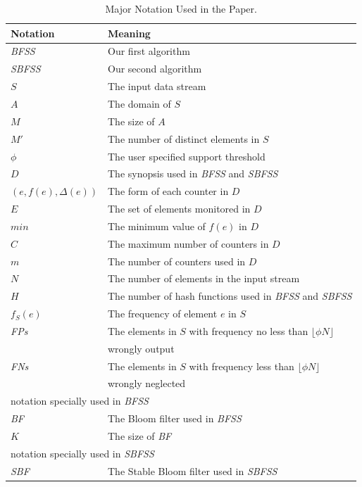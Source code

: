 \documentclass[conference]{IEEEtran}
\begin{document}
\begin{table}
	
    \caption{Major Notation Used in the Paper.}
   
	\begin{tabular}{ll}
		\hline	Notation  & Meaning\\ 
		\hline
		\emph{BFSS} & Our first algorithm\\
		\emph{SBFSS} & Our second algorithm\\	
		$S$ & The input data stream\\
		$A$ & The domain of $S$\\
		$M$ & The size of $A$\\
		$M'$ & The number of distinct elements in $S$\\
		$\phi$ & The user specified support threshold\\
		$D$ & The synopsis used in \emph{BFSS} and \emph{SBFSS}\\
	    $(e,f(e),\Delta(e))$ & The form of each counter in $D$\\ 
		$E$ & The set of elements monitored in $D$\\
		$min$ & The minimum value of $f(e)$ in $D$\\
		$C$ & The maximum number of counters in $D$\\
		$m$ & The number of counters used in $D$\\
		$N$ & The number of elements in the input stream\\
		$H$ & The number of hash functions used in \emph{BFSS} and \emph{SBFSS}\\
		$f_S(e)$ & The frequency of element $e$ in $S$\\ 
		\emph{FPs} &The elements in $S$ with frequency no less than $\lfloor \phi N\rfloor$\\& wrongly output\\
		\emph{FNs} & The elements in $S$ with frequency less than $\lfloor \phi N\rfloor$ \\&wrongly neglected\\
		\hline \multicolumn{2}{l}{notation specially used in \emph{BFSS}}\\
		\hline
		\emph{BF}  &The Bloom filter used in \emph{BFSS}\\
		$K$ & The size of \emph{BF}\\
        \hline
       \multicolumn{2}{l}{notation specially used in \emph{SBFSS}}\\
       \hline
       \emph{SBF} &The Stable Bloom filter used in \emph{SBFSS}\\

\end{tabular}
\end{table}
\end{document}

